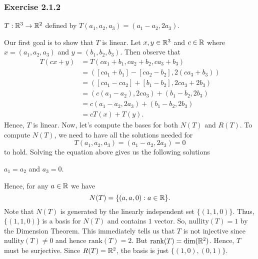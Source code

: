 \subsubsection{Exercise 2.1.2} \( T: \mathbb{R}^{3} \to \mathbb{R}^{2}  \) defined by \( T(a_{1}, a_{2}, a_{3}) = (a_{1} - a_{2}, 2a_{3}) \).
\begin{solution}
  Our first goal is to show that \( T  \) is linear. Let \( x,y \in \mathbb{R}^{3} \) and \( c \in \mathbb{R} \) where \( x = (a_{1}, a_{2}, a_{3}) \) and \( y = (b_{1}, b_{2}, b_{3}) \). Then observe that   
  \begin{align*}
      T(cx +y) &= T(ca_{1} + b_{1}, ca_{2} + b_{2}, ca_{3} + b_{3}) \\
               &= ( [ ca_{1} + b_{1}] - [ca_{2} - b_{2}], 2(ca_{3} + b_{3})) \\
               &= ([ca_{1} - ca_{2}] + [b_{1} - b_{2}], 2ca_{3} + 2b_{3}) \\
               &= (c(a_{1} - a_{2}), 2ca_{3}) + (b_{1} - b_{2}, 2b_{3}) \\
               &= c(a_{1} -a_{2}, 2a_{3}) + (b_{1} - b_{2}, 2b_{3}) \\
               &= cT(x) + T(y).
  \end{align*}
  Hence, \( T  \) is linear.
  Now, let's compute the bases for both \( N(T)  \) and \( R(T) \). To compute \( N(T) \), we need to have all the solutions needed for
  \[ T(a_{1}, a_{2}, a_{3}) = (a_{1} - a_{2}, 2a_{3}) = 0   \]
  to hold. Solving the equation above gives us the following solutions
  \begin{center}
      \( a_{1} = a_{2} \) and \( a_{3} = 0  \).
  \end{center}
  Hence, for any \( a \in \mathbb{R}  \) we have
  \[  N(T) = \{ (a,a,0) : a \in \mathbb{R}  \}. \]
  Note that \( N(T)  \) is generated by the linearly independent set \( \{ (1,1,0) \}  \).  Thus, \( \{ (1,1,0)  \}  \) is a basis for \( N(T) \) and contains \( 1  \) vector. So, \( \text{nullity}(T) = 1  \) by the Dimension Theorem. This immediately tells us that \( T \) is not injective since \( \text{nullity}(T) \neq 0  \) and hence \( \text{rank}(T) = 2  \). But \( \text{rank}(T) = \text{dim}(\mathbb{R}^{2}) \). Hence, \( T \) must be surjective. Since \( R(T) = \mathbb{R}^{2} \), the basis is just \( \{ (1,0), (0,1) \}  \).
\end{solution}

